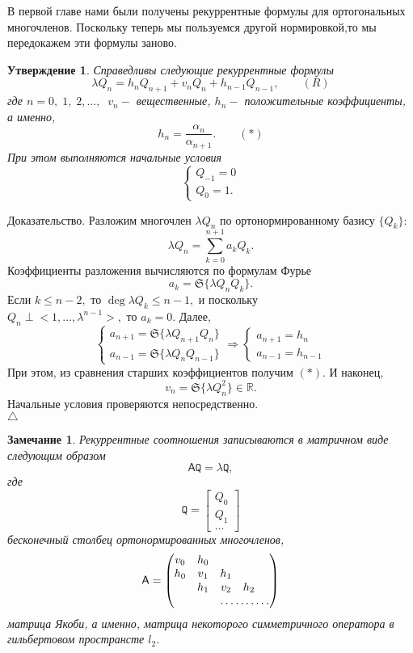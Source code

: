 \documentclass[12pt,a4paper]{article}
\theoremstyle{plain}   \newtheorem{Pro}{Задача}
\newtheorem{Sta}{Утверждение}
\newtheorem{Rem}{Замечание}
\begin{document}
В первой главе нами были
получены рекуррентные формулы для ортогональных многочленов.
Поскольку теперь мы пользуемся другой нормировкой,то
мы передокажем эти формулы заново.
\begin{Sta}
Справедливы следующие рекуррентные формулы
$$
  \lambda Q_n =h_n Q_{n+1}+v_n Q_n +h_{n-1}Q_{n-1},
  \qquad ( R)
$$
где
$ n=0, \; 1, \; 2,..., \; \; v_n - $
вещественные,
$ h_n - $
положительные коэффициенты, а именно,
$$
  h_n = \frac{\alpha _n }{\alpha _{n+1}} .
  \qquad ( \ast )
$$
При этом выполняются начальные условия
\begin{equation*}
  \begin{cases}
   Q_{-1}=0 \\
   Q_0 =1.
  \end{cases}
\end{equation*}
\end{Sta}
{\Large Доказательство.}
Разложим многочлен
$ \lambda Q_n $
по ортонормированному базису
$ \{ Q_k \} : $
$$
  \lambda Q_n = \sum _{k=0}^{n+1} a_k Q_k .
$$
Коэффициенты разложения вычисляются по формулам Фурье
$$
  a_k = \mathfrak{S} \{ \lambda Q_n Q_k \} .
$$
Если
$ k \leq n-2 , $
то
$ \deg \lambda Q_k \leq n-1 , $
и поскольку \\
$ Q_n \perp <1,...,\lambda ^{n-1}>, $
то
$ a_k =0 . $
Далее,
\begin{equation*}
  \begin{cases}
    a_{n+1}=\mathfrak{S} \{ \lambda Q_{n+1}Q_n \} \\
	a_{n-1}=\mathfrak{S} \{ \lambda Q_n Q_{n-1} \}
  \end{cases}
  \Rightarrow
  \begin{cases}
    a_{n+1}=h_n \\
	a_{n-1}=h_{n-1}
  \end{cases}
\end{equation*}
При этом, из сравнения старших коэффициентов получим
$ (\ast ) . $
И наконец,
$$
  v_n =\mathfrak{S} \{ \lambda Q_n ^2\} \in \mathbb{R} .
$$
Начальные условия проверяются непосредственно.\\
$ \triangle $
\begin{Rem}
Рекуррентные соотношения записываются в матричном виде следующим
образом
$$
  \mathsf{A} \mathtt{Q} = \lambda \mathtt{Q} ,
$$
где
$$
  \mathtt{Q}=
  \begin{bmatrix}
    Q_0 \\
	Q_1 \\
	\dots
  \end{bmatrix}
$$
бесконечный столбец ортонормированных многочленов,
$$
  \mathsf{A}=
    \begin{pmatrix}
	  v_0 & h_0 & \; & \; & \;  \\
	  h_0 & v_1 & h_1 & \; & \; \\
	  \; & h_1 & v_2 & h_2 & \;  \\
	  \; & \; & \hdotsfor{3}
	\end{pmatrix}
$$
матрица Якоби, а именно, матрица некоторого симметричного оператора
в гильбертовом пространсте
$ l_2 . $
\end{Rem}
\end{document}
